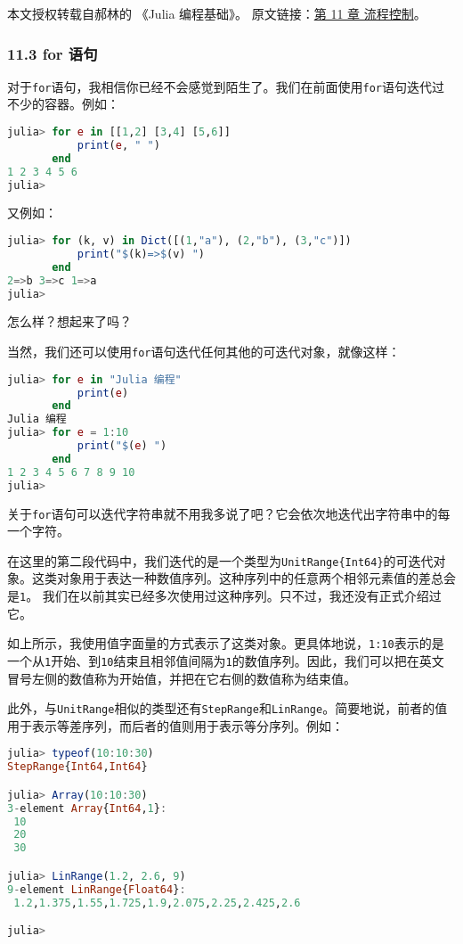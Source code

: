 
本文授权转载自郝林的 《Julia 编程基础》。 原文链接：\href{https://github.com/hyper0x/JuliaBasics/blob/master/book/ch11.md}{第 11 章 流程控制}。


\subsubsection{11.3 for 语句}

对于\verb`for`语句，我相信你已经不会感觉到陌生了。我们在前面使用\verb`for`语句迭代过不少的容器。例如：
\begin{lstlisting}[language=julia]
julia> for e in [[1,2] [3,4] [5,6]]
           print(e, " ")
       end
1 2 3 4 5 6 
julia> 
\end{lstlisting}

又例如：
\begin{lstlisting}[language=julia]
julia> for (k, v) in Dict([(1,"a"), (2,"b"), (3,"c")])
           print("$(k)=>$(v) ")
       end
2=>b 3=>c 1=>a 
julia> 
\end{lstlisting}

怎么样？想起来了吗？

当然，我们还可以使用\verb`for`语句迭代任何其他的可迭代对象，就像这样：
\begin{lstlisting}[language=julia]
julia> for e in "Julia 编程"
           print(e)
       end
Julia 编程
julia> for e = 1:10
           print("$(e) ")
       end
1 2 3 4 5 6 7 8 9 10 
julia> 
\end{lstlisting}

关于\verb`for`语句可以迭代字符串就不用我多说了吧？它会依次地迭代出字符串中的每一个字符。

在这里的第二段代码中，我们迭代的是一个类型为\verb`UnitRange{Int64}`的可迭代对象。这类对象用于表达一种数值序列。这种序列中的任意两个相邻元素值的差总会是\verb`1`。
我们在以前其实已经多次使用过这种序列。只不过，我还没有正式介绍过它。

如上所示，我使用值字面量的方式表示了这类对象。更具体地说，\verb`1:10`表示的是一个从\verb`1`开始、到\verb`10`结束且相邻值间隔为\verb`1`的数值序列。因此，我们可以把在英文冒号左侧的数值称为开始值，并把在它右侧的数值称为结束值。

此外，与\verb`UnitRange`相似的类型还有\verb`StepRange`和\verb`LinRange`。简要地说，前者的值用于表示等差序列，而后者的值则用于表示等分序列。例如：
\begin{lstlisting}[language=julia]
julia> typeof(10:10:30)
StepRange{Int64,Int64}

julia> Array(10:10:30)
3-element Array{Int64,1}:
 10
 20
 30

julia> LinRange(1.2, 2.6, 9)
9-element LinRange{Float64}:
 1.2,1.375,1.55,1.725,1.9,2.075,2.25,2.425,2.6

julia> 
\end{lstlisting}

